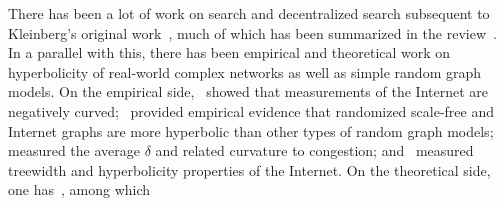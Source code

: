 \documentclass[11pt]{article}
\begin{document}
There has been a lot of work on search and decentralized search subsequent 
to Kleinberg's original work~\cite{Kle00,Kle01}, much of which has been 
summarized in the review~\cite{Kle06}.
In a parallel with this, there has been empirical and theoretical work on 
hyperbolicity of real-world complex networks as well as simple random graph 
models.
On the empirical side,~\cite{Bar02} showed that measurements of the Internet 
are negatively curved;~\cite{JL02,JL04,JLB08,LouTH,LohsoonTH} provided 
empirical evidence that randomized scale-free and Internet graphs are more 
hyperbolic than other types of random graph models;~\cite{NS11} measured 
the average $\delta$ and related curvature to congestion; and~\cite{montgolfier2011treewidth} 
measured treewidth and hyperbolicity properties of the Internet.
On the theoretical side, one has~\cite{PR00,JLB08,BRSV10,NST12,Tucci12,Shang12}, among which
\end{document}
